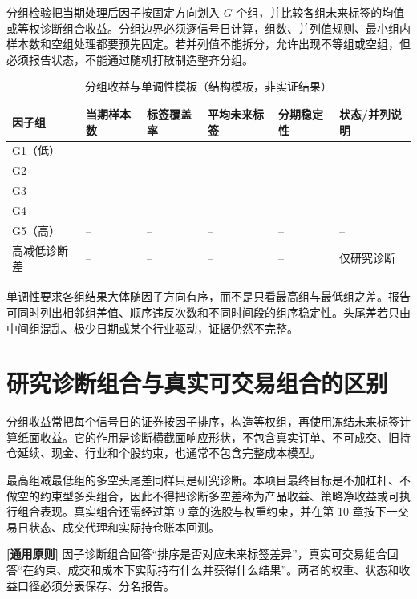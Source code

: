 分组检验把当期处理后因子按固定方向划入 \(G\) 个组，并比较各组未来标签的均值或等权诊断组合收益。分组边界必须逐信号日计算，组数、并列值规则、最小组内样本数和空组处理都要预先固定。若并列值不能拆分，允许出现不等组或空组，但必须报告状态，不能通过随机打散制造整齐分组。

\begin{table}[htbp]
  \centering
  \small
  \caption{分组收益与单调性模板（结构模板，非实证结果）}
  \label{tab:ch06-group-template}
  \begin{tabularx}{\textwidth}{p{1.45cm} p{1.65cm} p{2.0cm} p{2.1cm} p{2.2cm} Y}
    \toprule
    因子组 & 当期样本数 & 标签覆盖率 & 平均未来标签 & 分期稳定性 & 状态/并列说明 \\
    \midrule
    G1（低） & -- & -- & -- & -- & -- \\
    G2 & -- & -- & -- & -- & -- \\
    G3 & -- & -- & -- & -- & -- \\
    G4 & -- & -- & -- & -- & -- \\
    G5（高） & -- & -- & -- & -- & -- \\
    高减低诊断差 & -- & -- & -- & -- & 仅研究诊断 \\
    \bottomrule
  \end{tabularx}
\end{table}

单调性要求各组结果大体随因子方向有序，而不是只看最高组与最低组之差。报告可同时列出相邻组差值、顺序违反次数和不同时间段的组序稳定性。头尾差若只由中间组混乱、极少日期或某个行业驱动，证据仍然不完整。

\section{研究诊断组合与真实可交易组合的区别}

分组收益常把每个信号日的证券按因子排序，构造等权组，再使用冻结未来标签计算纸面收益。它的作用是诊断横截面响应形状，不包含真实订单、不可成交、旧持仓延续、现金、行业和个股约束，也通常不包含完整成本模型。

最高组减最低组的多空头尾差同样只是研究诊断。本项目最终目标是不加杠杆、不做空的约束型多头组合，因此不得把诊断多空差称为产品收益、策略净收益或可执行组合表现。真实组合还需经过第 9 章的选股与权重约束，并在第 10 章按下一交易日状态、成交代理和实际持仓账本回测。

\begin{principlebox}
\textbf{[通用原则]} 因子诊断组合回答“排序是否对应未来标签差异”，真实可交易组合回答“在约束、成交和成本下实际持有什么并获得什么结果”。两者的权重、状态和收益口径必须分表保存、分名报告。
\end{principlebox}

